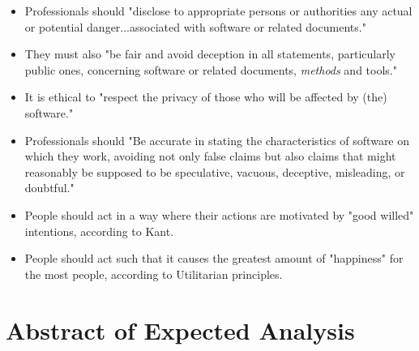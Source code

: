 \documentclass[11pt]{article}
\begin{document}
\begin{itemize}
\item Professionals should "disclose to appropriate persons or authorities any actual or potential danger...associated with software or related documents." \cite{secode}
\item They must also "be fair and avoid deception in all statements, particularly public ones, concerning software or related documents, \emph{methods} and tools." \cite{secode}
\item It is ethical to "respect the privacy of those who will be affected by (the) software." \cite{secode}
\item Professionals should "Be accurate in stating the characteristics of software on which they work, avoiding not only false claims but also claims that might reasonably be supposed to be speculative, vacuous, deceptive, misleading, or doubtful." \cite{secode}
\item People should act in a way where their actions are motivated by "good willed" intentions, according to Kant. \cite{kant}
\item People should act such that it causes the greatest amount of "happiness" for the most people, according to Utilitarian principles. \cite{util}
\end{itemize}

\section{Abstract of Expected Analysis}

\end{document}
